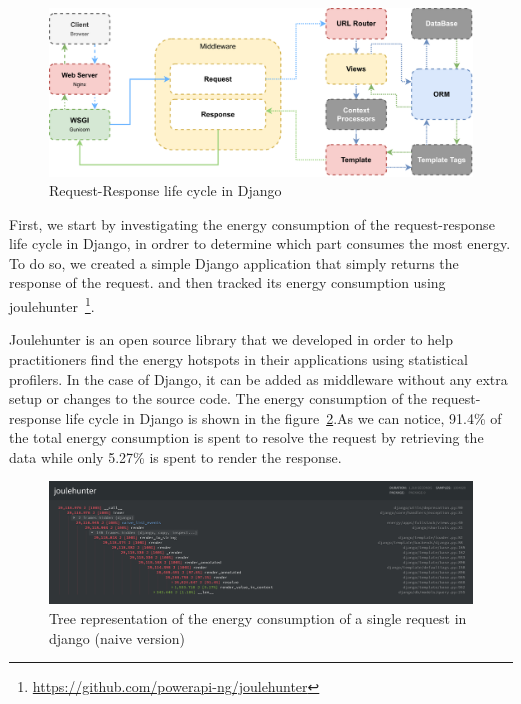 \begin{figure}[hbt]
    \centering
    \includegraphics[width=\linewidth]{imgs/django_request_lifecycle}
    \caption{Request-Response life cycle in Django}
    \label{fig:django-life-cycle}
\end{figure}

First, we start by investigating the energy consumption of the request-response life cycle in Django, in ordrer to determine which part consumes the most energy. To do so, we created a simple Django application that simply returns the response of the request. and then tracked its energy consumption using joulehunter~\footnote{\url{https://github.com/powerapi-ng/joulehunter}}.

Joulehunter is an open source library that we developed in order to help practitioners find the energy hotspots in their applications using statistical profilers. In the case of Django, it can be added as middleware without any extra setup or changes to the source code. The energy consumption of the request-response life cycle in Django is shown in the figure~\ref{fig:django_life_cycle_naive}.As we can notice, 91.4\% of the total energy consumption is spent to resolve the request by retrieving the data while only 5.27\% is spent to render the response.

\begin{figure}[hbt]
    \centering
    \includegraphics[width=\linewidth]{imgs/django_life_cycle_naive}
    \caption{Tree representation of the energy consumption of a single request in django (naive version)}
    \label{fig:django_life_cycle_naive}
\end{figure}



